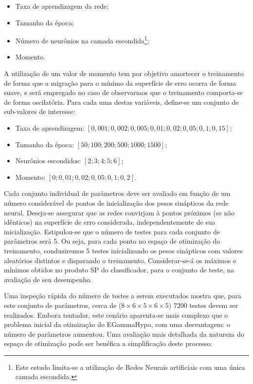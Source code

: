 \begin{itemize}
\item Taxa de aprendizagem da rede;
\item Tamanho da época;
\item Número de neurônios na camada escondida\footnote{Este estudo
limita-se a utilização de Redes Neurais artificiais com uma única camada
escondida.};
\item Momento.
\end{itemize}

A utilização de um valor de momento tem por objetivo amortecer o treinamento
de forma que a migração para o mínimo da superfície de erro ocorra de forma
suave, e será empregado no caso de observarmos que o treinamento comporta-se
de forma oscilatória. Para cada uma destas variáveis, define-se um conjunto de
sub-valores de interesse:

\begin{itemize}
\item Taxa de aprendizagem: $[0,001; 0,002; 0,005; 0,01; 0,02; 0,05; 0,1;
0,15]$;
\item Tamanho da época: $[50; 100; 200; 500; 1000; 1500]$;
\item Neurônios escondidos: $[2; 3; 4; 5; 6]$;
\item Momento: $[0; 0,01; 0,02; 0,05; 0,1; 0,2]$.
\end{itemize}

Cada conjunto individual de parâmetros deve ser avaliado em função de um
número considerável de pontos de inicialização dos pesos sinápticos da rede
neural. Deseja-se assegurar que as redes convirjam à pontos próximos (se não
idênticos) na superfície de erro considerada, independentemente de sua
inicialização. Estipulou-se que o número de testes para cada conjunto de
parâmetros será 5. Ou seja, para cada ponto no espaço de otimização do
treinamento, conduziremos 5 testes inicializando os pesos sinápticos com
valores aleatórios distintos e disparando o treinamento. Considerar-se-á os
máximos e mínimos obtidos no produto SP do classificador, para o conjunto de
teste, na avaliação de seu desempenho.

Uma inspeção rápida do número de testes a serem executados mostra que, para
este conjunto de parâmetros, cerca de ($8\times6\times5\times6\times5$) 
$7200$ testes devem ser realizados. Embora tentador, este cenário aparenta-se
mais complexo que o problema inicial da otimização do EGammaHypo, com uma
desvantagem: o número de parâmetros aumentou. Uma avaliação mais detalhada da
natureza do espaço de otimização pode ser benéfica a simplificação deste
processo: 

